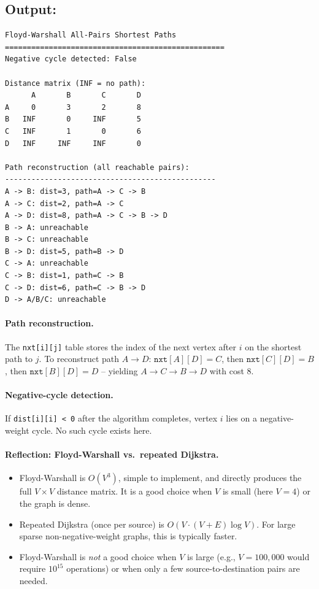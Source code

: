 \documentclass[11pt,a4paper]{article}
\begin{document}
\subsection{Output:}
\begin{lstlisting}[style=output]
Floyd-Warshall All-Pairs Shortest Paths
==================================================
Negative cycle detected: False

Distance matrix (INF = no path):
      A       B       C       D
A     0       3       2       8
B   INF       0     INF       5
C   INF       1       0       6
D   INF     INF     INF       0

Path reconstruction (all reachable pairs):
------------------------------------------------
A -> B: dist=3, path=A -> C -> B
A -> C: dist=2, path=A -> C
A -> D: dist=8, path=A -> C -> B -> D
B -> A: unreachable
B -> C: unreachable
B -> D: dist=5, path=B -> D
C -> A: unreachable
C -> B: dist=1, path=C -> B
C -> D: dist=6, path=C -> B -> D
D -> A/B/C: unreachable
\end{lstlisting}

\paragraph{Path reconstruction.}
The \texttt{nxt[i][j]} table stores the index of the next vertex after $i$ on the shortest path to $j$. To reconstruct path $A\to D$: $\mathtt{nxt}[A][D]=C$, then $\mathtt{nxt}[C][D]=B$, then $\mathtt{nxt}[B][D]=D$ -- yielding $A\to C\to B\to D$ with cost 8.

\paragraph{Negative-cycle detection.}
If \texttt{dist[i][i] < 0} after the algorithm completes, vertex $i$ lies on a negative-weight cycle. No such cycle exists here.

\paragraph{Reflection: Floyd-Warshall vs.\ repeated Dijkstra.}
\begin{itemize}[noitemsep]
  \item Floyd-Warshall is $O(V^3)$, simple to implement, and directly produces the full $V\times V$ distance matrix. It is a good choice when $V$ is small (here $V=4$) or the graph is dense.
  \item Repeated Dijkstra (once per source) is $O(V\cdot(V+E)\log V)$. For large sparse non-negative-weight graphs, this is typically faster.
  \item Floyd-Warshall is \emph{not} a good choice when $V$ is large (e.g., $V=100{,}000$ would require $10^{15}$ operations) or when only a few source-to-destination pairs are needed.
\end{itemize}
\end{document}

